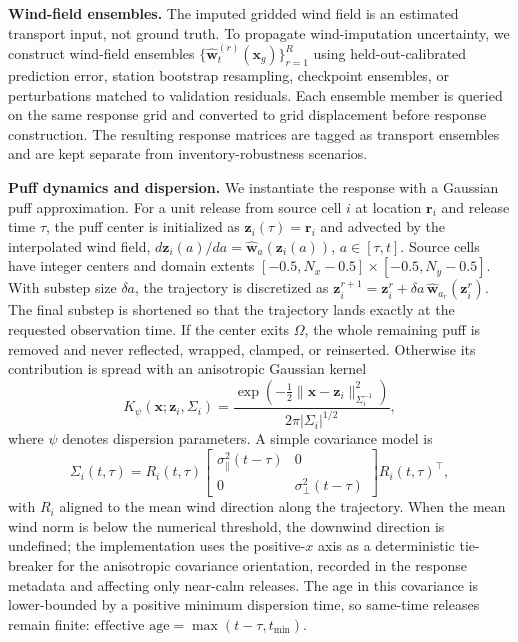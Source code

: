 \noindent\textbf{Wind-field ensembles.}
The imputed gridded wind field is an estimated transport input, not ground truth.
To propagate wind-imputation uncertainty, we construct wind-field ensembles
\(\{\widehat{\mathbf w}^{(r)}_t(\mathbf x_g)\}_{r=1}^R\) using held-out-calibrated
prediction error, station bootstrap resampling, checkpoint ensembles, or
perturbations matched to validation residuals.  Each ensemble member is queried
on the same response grid and converted to grid displacement before response
construction.  The resulting response matrices are tagged as transport
ensembles and are kept separate from inventory-robustness scenarios.

\noindent\textbf{Puff dynamics and dispersion.}
We instantiate the response with a Gaussian puff approximation.  For a
unit release from source cell \(i\) at location \(\mathbf r_i\) and release time
\(\tau\), the puff center is initialized as \(\mathbf z_i(\tau)=\mathbf r_i\) and
advected by the interpolated wind field,
\(d\mathbf z_i(a)/da=\widehat{\mathbf w}_a(\mathbf z_i(a))\), \(a\in[\tau,t]\).
Source cells have integer centers and domain extents
\([-0.5,N_x-0.5]\times[-0.5,N_y-0.5]\).  With substep size \(\delta a\), the
trajectory is discretized as
\(\mathbf z_i^{r+1}=\mathbf z_i^r+\delta a\,\widehat{\mathbf w}_{a_r}(\mathbf z_i^r)\).
The final substep is shortened so that the trajectory lands exactly at the
requested observation time.  If the center exits \(\Omega\), the whole
remaining puff is removed and never reflected, wrapped, clamped, or reinserted.
Otherwise its contribution is spread with an anisotropic Gaussian kernel
\begin{equation}
K_\psi(\mathbf x;\mathbf z_i,\Sigma_i)
=\frac{\exp\left(-\frac12\|\mathbf x-\mathbf z_i\|_{\Sigma_i^{-1}}^2\right)}
{2\pi |\Sigma_i|^{1/2}},
\label{eq:gaussian_kernel}
\end{equation}
where \(\psi\) denotes dispersion parameters.  A simple covariance model is
\begin{equation}
\Sigma_i(t,\tau)
= R_i(t,\tau)
\begin{bmatrix}
\sigma_\parallel^2(t-\tau) & 0\\
0 & \sigma_\perp^2(t-\tau)
\end{bmatrix}
R_i(t,\tau)^\top,
\label{eq:dispersion_covariance}
\end{equation}
with \(R_i\) aligned to the mean wind direction along the trajectory.  When the
mean wind norm is below the numerical threshold, the downwind direction is
undefined; the implementation uses the positive-\(x\) axis as a deterministic
tie-breaker for the anisotropic covariance orientation, recorded in the response
metadata and affecting only near-calm releases.  The age in this covariance is
lower-bounded by a positive minimum dispersion time, so same-time releases remain
finite: \(\text{effective age} = \max(t-\tau, t_{\min})\).

